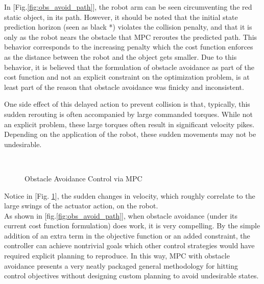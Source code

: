 \documentclass[journal]{IEEEtran}
\begin{document}
In [Fig.\ref{fig:obs_avoid_path}], the robot arm can be seen circumventing the red static object, in its path. However, it should be noted that the initial state prediction horizon (seen as black *) violates the collision penalty, and that it is only as the robot nears the obstacle that MPC reroutes the predicted path. This behavior corresponds to the increasing penalty which the cost function enforces as the distance between the robot and the object gets smaller. Due to this behavior, it is believed that the formulation of obstacle avoidance as part of the cost function and not an explicit constraint on the optimization problem, is at least part of the reason that obstacle avoidance was finicky and inconsistent.

One side effect of this delayed action to prevent collision is that, typically, this sudden rerouting is often accompanied by large commanded torques. While not an explicit problem, these large torques often result in significant velocity pikes. Depending on the application of the robot, these sudden movements may not be undesirable. \\

\begin{figure}[ht]%
    \centering
    \\
    \caption{Obstacle Avoidance Control via MPC}%
    \label{fig:obs_avoid_control_action}%
\end{figure}



\noindent Notice in [Fig. \ref{fig:obs_avoid_control_action}], the sudden changes in velocity, which roughly correlate to the large swings of the actuator action, on the robot. \\

As shown in [fig.\ref{fig:obs_avoid_path}], when obstacle avoidance (under its current cost function formulation) does work, it is very compelling. By the simple addition of an extra term in the objective function or an added constraint, the controller can achieve nontrivial goals which other control strategies would have required explicit planning to reproduce. In this way, MPC with obstacle avoidance presents a very neatly packaged general methodology for hitting control objectives without designing custom planning to avoid undesirable states. \\
\end{document}
